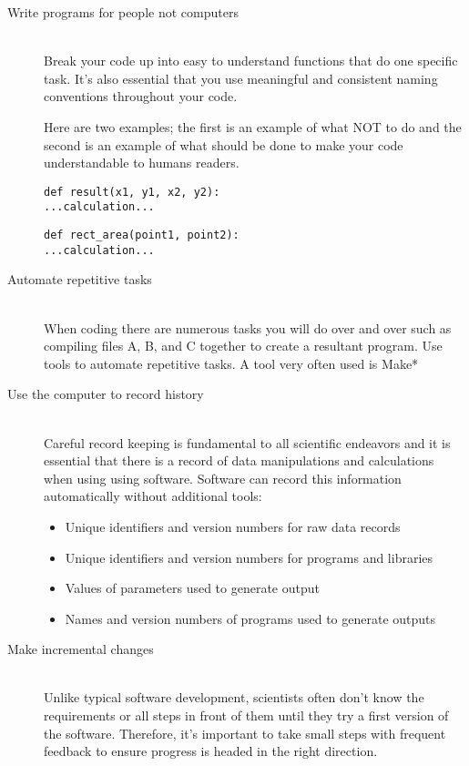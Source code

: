 \documentclass[12pt,a4paper,oneside,draft]{article}
\begin{document}
\begin{description}
   \item[Write programs for people not computers] \hfill \\
   Break your code up into easy to understand functions that do one specific task. It's also essential that you use meaningful and consistent naming conventions throughout your code.
   
   Here are two examples; the first is an example of what NOT to do and the second is an example of what should be done to make your code understandable to humans readers.

\begin{verbatim}
def result(x1, y1, x2, y2):
...calculation...
\end{verbatim}

\begin{verbatim}
def rect_area(point1, point2):
...calculation...
\end{verbatim}
      
   \item[Automate repetitive tasks] \hfill \\
   When coding there are numerous tasks you will do over and over such as compiling files A, B, and C together to create a resultant program. Use tools to automate repetitive tasks. A tool very often used is Make*
   
   \item[Use the computer to record history] \hfill \\
   Careful record keeping is fundamental to all scientific endeavors and it is essential that there is a record of data manipulations and calculations when using using software. Software can record this information automatically without additional tools:    
   \begin{itemize}
     \item Unique identifiers and version numbers for raw data records
     \item Unique identifiers and version numbers for programs and
libraries
     \item Values of parameters used to generate output
     \item Names and version numbers of programs used to generate outputs
   \end{itemize}
   
   \item[Make incremental changes] \hfill \\
   Unlike typical software development, scientists often don't know the requirements or all steps in front of them until they try a first version of the software. Therefore, it's important to take small steps with frequent feedback to ensure progress is headed in the right direction.   
   

\end{description}
\end{document}
